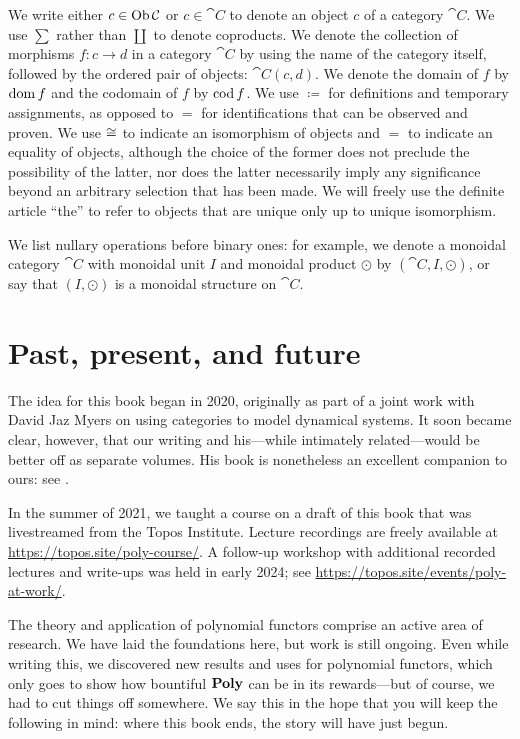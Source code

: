 \documentclass[Book-Poly]{subfiles}
\begin{document}
We write either $c\in\operatorname{Ob}\mathcal{C}$ or $c\in\cat{C}$ to denote an object $c$ of a category $\cat{C}$.
We use $\sum$ rather than $\coprod$ to denote coproducts.
We denote the collection of morphisms $f\colon c\to d$ in a category $\cat{C}$ by using the name of the category itself, followed by the ordered pair of objects: $\cat{C}(c,d)$.
We denote the domain of $f$ by $\operatorname{dom} f$ and the codomain of $f$ by $\operatorname{cod} f$.
We use $\coloneqq$ for definitions and temporary assignments, as opposed to $=$ for identifications that can be observed and proven.
We use $\cong$ to indicate an isomorphism of objects and $=$ to indicate an equality of objects, although the choice of the former does not preclude the possibility of the latter, nor does the latter necessarily imply any significance beyond an arbitrary selection that has been made.
We will freely use the definite article ``the'' to refer to objects that are unique only up to unique isomorphism.


We list nullary operations before binary ones: for example, we denote a monoidal category $\cat{C}$ with monoidal unit $I$ and monoidal product $\odot$ by $(\cat{C},I,\odot)$, or say that $(I,\odot)$ is a monoidal structure on $\cat{C}$.

\section{Past, present, and future}

The idea for this book began in 2020, originally as part of a joint work with David Jaz Myers on using categories to model dynamical systems.
It soon became clear, however, that our writing and his---while intimately related---would be better off as separate volumes.
His book is nonetheless an excellent companion to ours: see \cite{jaz}.

In the summer of 2021, we taught a course on a draft of this book that was livestreamed from the Topos Institute.
Lecture recordings are freely available at \url{https://topos.site/poly-course/}.
A follow-up workshop with additional recorded lectures and write-ups was held in early 2024; see \url{https://topos.site/events/poly-at-work/}.

The theory and application of polynomial functors comprise an active area of research.
We have laid the foundations here, but work is still ongoing.
Even while writing this, we discovered new results and uses for polynomial functors, which only goes to show how bountiful $\mathbf{Poly}$ can be in its rewards---but of course, we had to cut things off somewhere.
We say this in the hope that you will keep the following in mind: where this book ends, the story will have just begun.
\end{document}
